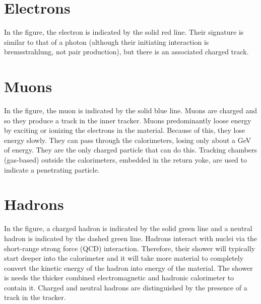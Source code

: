 \section{Electrons}
In the figure, the electron is indicated by the solid red line.  Their signature is similar to that of a photon (although their initiating interaction is bremsstrahlung, not pair production), but there is an associated charged track.
\section{Muons}
In the figure, the muon is indicated by the solid blue line. Muons are charged and so they produce a track in the inner tracker. Muons predominantly loose energy by exciting or ionizing the electrons in the material.  Because of this, they lose energy slowly. They can pass through the calorimeters, losing only about a GeV of energy.  They are the only charged particle that can do this.  Tracking chambers (gas-based) outside the calorimeters, embedded in the return yoke, are used to indicate a penetrating particle.
\section{Hadrons}
In the figure, a charged hadron is indicated by the solid green line and a neutral hadron is indicated by the dashed green line. Hadrons interact with nuclei via the short-range strong force (QCD) interaction. Therefore, their shower will typically start deeper into the calorimeter and it will take more material to completely convert the kinetic energy of the hadron into energy of the material. The shower is needs the thicker combined electromagnetic and hadronic calorimeter to contain it. Charged and neutral hadrons are distinguished by the presence of a track in the tracker.

